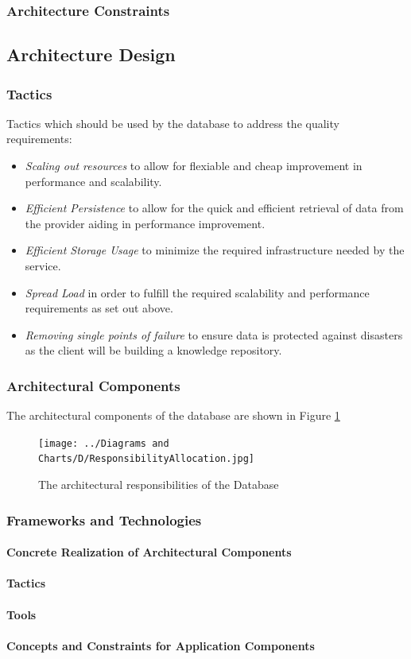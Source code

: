 \subsubsection{Architecture Constraints}
\subsection{Architecture Design}
\subsubsection{Tactics}
Tactics which should be used by the database to address the quality requirements:
\begin{itemize}
	\item \textit{Scaling out resources} to allow for flexiable and cheap
		improvement in performance and scalability.
	\item \textit{Efficient Persistence} to allow for the quick and efficient
		retrieval of data from the provider aiding in performance
		improvement.
	\item \textit{Efficient Storage Usage} to minimize the required
	infrastructure needed by the service.
	\item \textit{Spread Load} in order to fulfill the required scalability
		and performance requirements as set out above.
	\item \textit{Removing single points of failure} to ensure data is
		protected against disasters as the client will be building a
		knowledge repository.
\end{itemize}

\subsubsection{Architectural Components}
The architectural components of the database are shown in 
Figure \ref{fig:databaseResponsibilityAllocation}
\begin{figure}[H]
	\begin{center}
	\texttt{[image: ../Diagrams and Charts/D/ResponsibilityAllocation.jpg]}
	\caption{The architectural responsibilities of the Database}
	\label{fig:databaseResponsibilityAllocation}
	\end{center}
\end{figure}

\subsubsection{Frameworks and Technologies}
\paragraph{Concrete Realization of Architectural Components}
\paragraph{Tactics}
\paragraph{Tools}
\paragraph{Concepts and Constraints for Application Components}